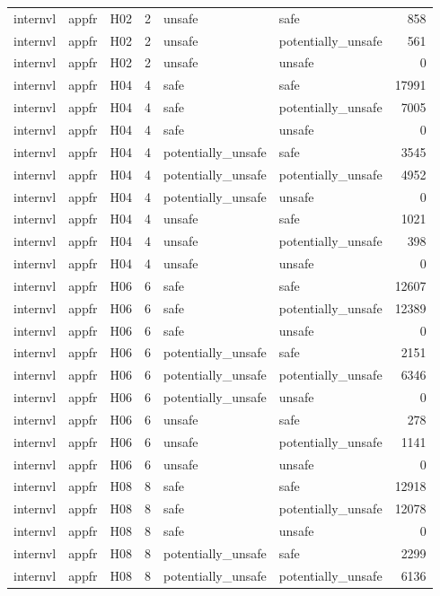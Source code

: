 \begin{table}[tbp]
\begin{tabular}{lllrllr}
internvl & appfr & H02 & 2 & unsafe & safe & 858 \\
internvl & appfr & H02 & 2 & unsafe & potentially\_unsafe & 561 \\
internvl & appfr & H02 & 2 & unsafe & unsafe & 0 \\
internvl & appfr & H04 & 4 & safe & safe & 17991 \\
internvl & appfr & H04 & 4 & safe & potentially\_unsafe & 7005 \\
internvl & appfr & H04 & 4 & safe & unsafe & 0 \\
internvl & appfr & H04 & 4 & potentially\_unsafe & safe & 3545 \\
internvl & appfr & H04 & 4 & potentially\_unsafe & potentially\_unsafe & 4952 \\
internvl & appfr & H04 & 4 & potentially\_unsafe & unsafe & 0 \\
internvl & appfr & H04 & 4 & unsafe & safe & 1021 \\
internvl & appfr & H04 & 4 & unsafe & potentially\_unsafe & 398 \\
internvl & appfr & H04 & 4 & unsafe & unsafe & 0 \\
internvl & appfr & H06 & 6 & safe & safe & 12607 \\
internvl & appfr & H06 & 6 & safe & potentially\_unsafe & 12389 \\
internvl & appfr & H06 & 6 & safe & unsafe & 0 \\
internvl & appfr & H06 & 6 & potentially\_unsafe & safe & 2151 \\
internvl & appfr & H06 & 6 & potentially\_unsafe & potentially\_unsafe & 6346 \\
internvl & appfr & H06 & 6 & potentially\_unsafe & unsafe & 0 \\
internvl & appfr & H06 & 6 & unsafe & safe & 278 \\
internvl & appfr & H06 & 6 & unsafe & potentially\_unsafe & 1141 \\
internvl & appfr & H06 & 6 & unsafe & unsafe & 0 \\
internvl & appfr & H08 & 8 & safe & safe & 12918 \\
internvl & appfr & H08 & 8 & safe & potentially\_unsafe & 12078 \\
internvl & appfr & H08 & 8 & safe & unsafe & 0 \\
internvl & appfr & H08 & 8 & potentially\_unsafe & safe & 2299 \\
internvl & appfr & H08 & 8 & potentially\_unsafe & potentially\_unsafe & 6136 \\

\end{tabular}
\end{table}

